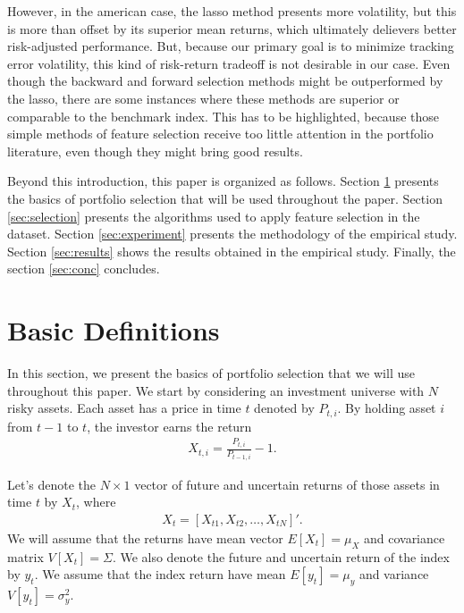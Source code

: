 \documentclass[preprint, doubleblind, authoryear,10pt]{elsarticle}
\begin{document}
However, in the american case, the lasso method presents more volatility, but this is more than offset by its superior mean returns, which ultimately delievers better risk-adjusted performance.
But, because our primary goal is to minimize tracking error volatility, this kind of risk-return tradeoff is not desirable in our case.
Even though the backward and forward selection methods might be outperformed by the lasso, there are some instances where these methods are superior or comparable to the benchmark index. 
This has to be highlighted, because those simple methods of feature selection receive too little attention in the portfolio literature, even though they might bring good results.


Beyond this introduction, this paper is organized as follows.
Section \ref{sec:defs} presents the basics of portfolio selection that will be used throughout the paper.
Section \ref{sec:selection} presents the algorithms used to apply feature selection in the dataset.
Section \ref{sec:experiment} presents the methodology of the empirical study.
Section \ref{sec:results} shows the results obtained in the empirical study.
Finally, the section \ref{sec:conc} concludes.

\section{Basic Definitions} \label{sec:defs}

In this section, we present the basics of portfolio selection that we will use throughout this paper.
We start by considering an investment universe with $N$ risky assets.
Each asset has a price in time $t$ denoted by $P_{t,i}$.
By holding asset $i$ from $t-1$ to $t$, the investor earns the return
\begin{align} \label{eq:ret}
	X_{t,i} = \frac{P_{t,i}}{P_{t-1,i}} - 1.
\end{align}

Let's  denote the $N\times1$ vector of future and uncertain returns of those assets in time $t$ by $X_{t}$, where 
\begin{align*} %
	X_{t} =  [X_{t1}, X_{t2} , \dots, X_{tN}]'.
\end{align*}
We will assume that the returns have mean vector $E[X_{t}] =\mu_{X}$ and covariance matrix $V[X_{t}] =\Sigma$.
We also denote the future and uncertain return of the index by $y_{t}$.
We assume that the index return have mean $E[y_{t}] = \mu_{y}$ and variance $V[y_{t}]=\sigma^2_{y}$.
\end{document}
